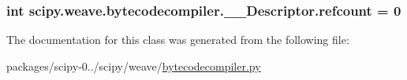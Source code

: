 \subsubsection[{refcount}]{\setlength{\rightskip}{0pt plus 5cm}int scipy.\+weave.\+bytecodecompiler.\+\_\+\+\_\+\+Descriptor.\+refcount = 0\hspace{0.3cm}{\ttfamily [static]}}\label{classscipy_1_1weave_1_1bytecodecompiler_1_1____Descriptor_acabdb8436f2be6e2b3e2216a126818c2}


The documentation for this class was generated from the following file\+:\begin{DoxyCompactItemize}
\item 
packages/scipy-\/0../scipy/weave/\hyperlink{bytecodecompiler_8py}{bytecodecompiler.\+py}\end{DoxyCompactItemize}
